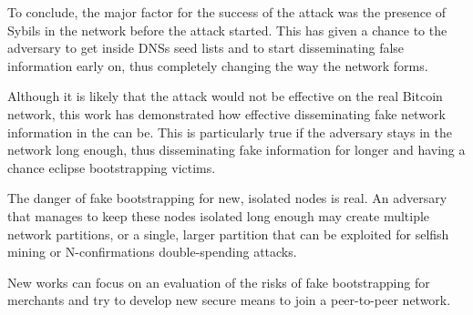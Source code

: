 To conclude, the major factor for the success of the attack was the presence of Sybils in the network before the attack started. This has given a chance to the adversary to get inside DNSs seed lists and to start disseminating false information early on, thus completely changing the way the network forms.

Although it is likely that the attack would not be effective on the real Bitcoin network, this work has demonstrated how effective disseminating fake network information in the can be. This is particularly true if the adversary stays in the network long enough, thus disseminating fake information for longer and having a chance eclipse bootstrapping victims.

The danger of fake bootstrapping for new, isolated nodes is real. An adversary that manages to keep these nodes isolated long enough may create multiple network partitions, or a single, larger partition that can be exploited for selfish mining or N-confirmations double-spending attacks.

New works can focus on an evaluation of the risks of fake bootstrapping for merchants and try to develop new secure means to join a peer-to-peer network. 